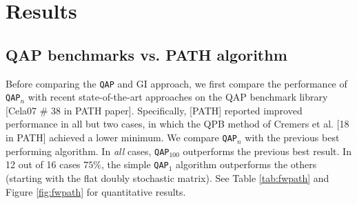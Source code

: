 \documentclass{article} %
\newcommand{\qap}{\texttt{QAP} }
\newcommand{\qapa}{\texttt{QAP$_1$} }
\newcommand{\qapn}{\texttt{QAP$_n$} }
\newcommand{\qapb}{\texttt{QAP$_{100}$} }
\begin{document}


\section{Results}

\subsection{QAP benchmarks vs. PATH algorithm}

Before comparing the \qap and GI approach, we first compare the performance of \qapn with recent state-of-the-art approaches on the QAP benchmark library [Cela07 \# 38 in PATH paper].  Specifically, [PATH] reported improved performance in all but two cases, in which the QPB method of Cremers et al. [18 in PATH] achieved a lower minimum.  We compare \qapn with the previous best performing algorithm.  In \emph{all} cases, \qapb outperforms the previous best result.  In 12 out of 16 cases $75\%$, the simple \qapa algorithm outperforms the others (starting with the flat doubly stochastic matrix).  See Table \ref{tab:fwpath} and Figure \ref{fig:fwpath} for quantitative results.
\end{document}

